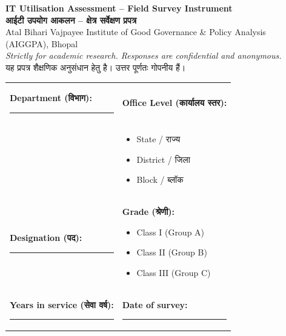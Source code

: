 \documentclass[11pt,a4paper]{article}
\newcommand{\hindi}[1]{{\hindifont #1}}
\newcommand{\choices}[1]{%
  \begin{itemize}[label=$\square$, leftmargin=1.4em, itemsep=1pt, topsep=2pt]
    #1
  \end{itemize}
}
\begin{document}
\begin{tcolorbox}[colback=govblue,colframe=govblue,arc=2mm]
  \color{white}
  \centering
  {\large\bfseries IT Utilisation Assessment -- Field Survey Instrument}\\[0.3em]
  {\normalsize\bfseries \hindi{आईटी उपयोग आकलन -- क्षेत्र सर्वेक्षण प्रपत्र}}\\[0.5em]
  {\small Atal Bihari Vajpayee Institute of Good Governance \& Policy Analysis (AIGGPA), Bhopal}\\
  {\small \textit{Strictly for academic research. Responses are confidential and anonymous.}\\
  \hindi{यह प्रपत्र शैक्षणिक अनुसंधान हेतु है। उत्तर पूर्णतः गोपनीय हैं।}}
\end{tcolorbox}

\vspace{0.4cm}

\begin{tcolorbox}[colback=lightgray,colframe=govblue!50,arc=2mm,boxrule=0.5pt,title=\textbf{Respondent Details \hindi{(प्रतिभागी विवरण)}} -- \textit{not shared publicly},fonttitle=\small]
\small
\noindent
\begin{tabularx}{\textwidth}{@{}XX@{}}
  \textbf{Department \hindi{(विभाग)}:} \rule{5cm}{0.3pt} &
  \textbf{Office Level \hindi{(कार्यालय स्तर)}:} \\[2pt]
  & \choices{
    \item State / \hindi{राज्य}
    \item District / \hindi{जिला}
    \item Block / \hindi{ब्लॉक}
  }\\[4pt]
  \textbf{Designation \hindi{(पद)}:} \rule{5cm}{0.3pt} &
  \textbf{Grade \hindi{(श्रेणी)}:}
  \choices{
    \item Class I (Group A)
    \item Class II (Group B)
    \item Class III (Group C)
  }\\[4pt]
  \textbf{Years in service \hindi{(सेवा वर्ष)}:} \rule{3.5cm}{0.3pt} &
  \textbf{Date of survey:} \rule{3.5cm}{0.3pt}
\end{tabularx}
\end{tcolorbox}

\vspace{0.5cm}
\end{document}
